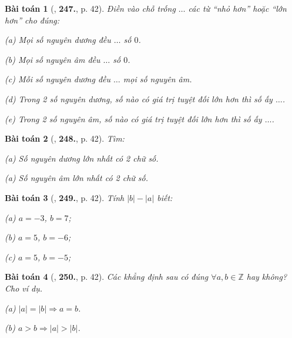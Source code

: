 \documentclass{article}
\numberwithin{equation}{section}
\newtheorem{baitoan}{Bài toán}
\begin{document}
\begin{baitoan}[\cite{Binh_Toan_6_tap_1}, \textbf{247.}, p. 42]
	Điền vào chỗ trống $\ldots$ các từ ``nhỏ hơn'' hoặc ``lớn hơn'' cho đúng:
	\begin{enumerate*}
		\item[(a)] Mọi số nguyên dương đều $\ldots$ số $0$.
		\item[(b)] Mọi số nguyên âm đều $\ldots$ số $0$.
		\item[(c)] Mỗi số nguyên dương đều $\ldots$ mọi số nguyên âm.
		\item[(d)] Trong 2 số nguyên dương, số nào có giá trị tuyệt đối lớn hơn thì số ấy $\ldots$.
		\item[(e)] Trong 2 số nguyên âm, số nào có giá trị tuyệt đối lớn hơn thì số ấy $\ldots$.
	\end{enumerate*}
\end{baitoan}

\begin{baitoan}[\cite{Binh_Toan_6_tap_1}, \textbf{248.}, p. 42]
	Tìm:
	\begin{enumerate*}
		\item[(a)] Số nguyên dương lớn nhất có 2 chữ số.
		\item[(a)] Số nguyên âm lớn nhất có 2 chữ số.
	\end{enumerate*}
\end{baitoan}

\begin{baitoan}[\cite{Binh_Toan_6_tap_1}, \textbf{249.}, p. 42]
	Tính $|b| - |a|$ biết: 
	\begin{enumerate*}
		\item[(a)] $a = -3$, $b = 7$;
		\item[(b)] $a = 5$, $b = -6$;
		\item[(c)] $a = 5$, $b = -5$;
	\end{enumerate*}
\end{baitoan}

\begin{baitoan}[\cite{Binh_Toan_6_tap_1}, \textbf{250.}, p. 42]
	Các khẳng định sau có đúng $\forall a,b\in\mathbb{Z}$ hay không? Cho ví dụ.
	\begin{enumerate*}
		\item[(a)] $|a| = |b|\Rightarrow a = b$.
		\item[(b)] $a > b\Rightarrow|a| > |b|$.
	\end{enumerate*}
\end{baitoan}

\end{document}

